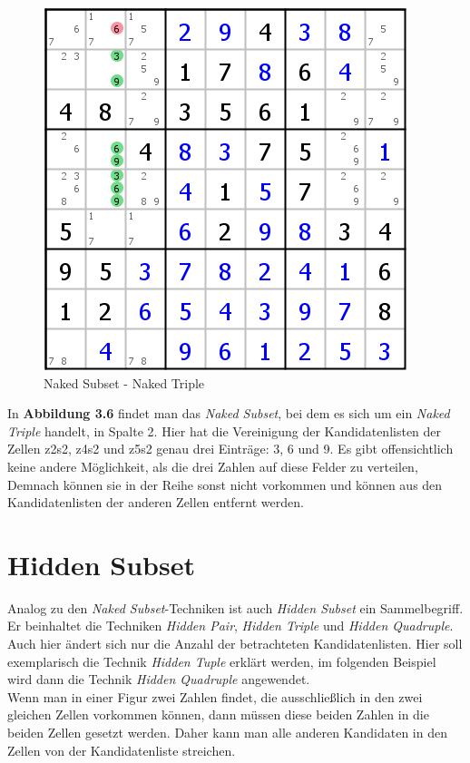 \documentclass[accentcolor=tud6b,11pt,paper=a4]{tudreport}
\begin{document}
\begin{figure}[h]
\begin{center}
\includegraphics{./img/naked_subset.png}
\caption{Naked Subset - Naked Triple}
\end{center}
\end{figure}

In \textbf{Abbildung 3.6} findet man das \textit{Naked Subset}, bei dem es sich um ein \textit{Naked Triple} handelt, in Spalte 2. Hier hat die Vereinigung der Kandidatenlisten der Zellen z2s2, z4s2 und z5s2 genau drei Einträge: 3, 6 und 9. Es gibt offensichtlich keine andere Möglichkeit, als die drei Zahlen auf diese Felder zu verteilen, Demnach können sie in der Reihe sonst nicht vorkommen und können aus den Kandidatenlisten der anderen Zellen entfernt werden.

\newpage
\section{Hidden Subset}
Analog zu den \textit{Naked Subset}-Techniken ist auch \textit{Hidden Subset} ein Sammelbegriff. Er beinhaltet die Techniken \textit{Hidden Pair}, \textit{Hidden Triple} und \textit{Hidden Quadruple}. Auch hier ändert sich nur die Anzahl der betrachteten Kandidatenlisten. Hier soll exemplarisch die Technik \textit{Hidden Tuple} erklärt werden, im folgenden Beispiel wird dann die Technik \textit{Hidden Quadruple} angewendet.\\
Wenn man in einer Figur zwei Zahlen findet, die ausschließlich in den zwei gleichen Zellen vorkommen können, dann müssen diese beiden Zahlen in die beiden Zellen gesetzt werden. Daher kann man alle anderen Kandidaten in den Zellen von der Kandidatenliste streichen.
\end{document}
